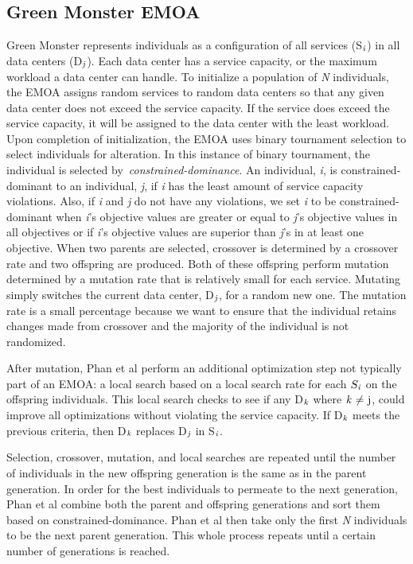 \documentclass{sig-alternate}
\begin{document}
\subsection{Green Monster EMOA}
\label{sec:GMEMOA}

Green Monster represents individuals as a configuration of all services (S$_{\text{\emph{i}}}$) in all data centers (D$_{\text{\emph{j}}}$). Each data center has a service capacity, or the maximum workload a data center can handle. To initialize a population of \emph{N} individuals, the EMOA assigns random services to random data centers so that any given data center does not exceed the service capacity. If the service does exceed the service capacity, it will be assigned to the data center with the least workload. Upon completion of initialization, the EMOA uses binary tournament selection to select individuals for alteration. In this instance of binary tournament, the individual is selected by~\emph{constrained-dominance}. An individual, \emph{i}, is constrained-dominant to an individual, \emph{j}, if \emph{i} has the least amount of service capacity violations. Also, if \emph{i} and \emph{j} do not have any violations, we set \emph{i} to be constrained-dominant when \emph{i}'s objective values are greater or equal to \emph{j}'s objective values in all objectives or if \emph{i}'s objective values are superior than \emph{j}'s in at least one objective. When two parents are selected, crossover is determined by a crossover rate and two offspring are produced. Both of these offspring perform mutation determined by a mutation rate that is relatively small for each service. Mutating simply switches the current data center, D$_{\text{\emph{j}}}$, for a random new one. The mutation rate is a small percentage because we want to ensure that the individual retains changes made from crossover and the majority of the individual is not randomized. 

After mutation, Phan et al perform an additional optimization step not typically part of an EMOA: a local search based on a local search rate for each $S_{\text{\emph{i}}}$ on the offspring individuals. This local search checks to see if any D$_{\text{\emph{k}}}$ where ${\text{\emph{k} ${\neq}$ j}}$, could improve all optimizations without violating the service capacity. If D$_{\text{\emph{k}}}$ meets the previous criteria, then D$_{\text{\emph{k}}}$ replaces D$_{\text{\emph{j}}}$ in S$_{\text{\emph{i}}}$. 

Selection, crossover, mutation, and local searches are repeated until the number of individuals in the new offspring generation is the same as in the parent generation. In order for the best individuals to permeate to the next generation, Phan et al combine both the parent and offspring generations and sort them based on constrained-dominance. Phan et al then take only the first \emph{N} individuals to be the next parent generation. This whole process repeats until a certain number of generations is reached. 
\end{document}
